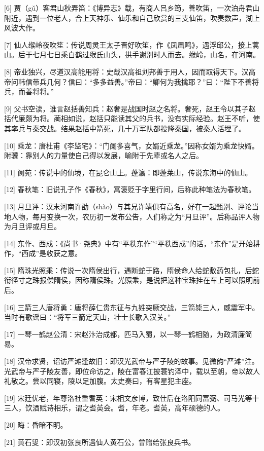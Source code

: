 \documentclass[12pt,UTF8]{ctexbook}
\begin{document}
[6] 贾（gǔ）客君山秋弄笛：《博异志》载，有商人吕乡筠，善吹笛，一次泊舟君山附近，遇到一位老人，合上天神乐、仙乐和自己欣赏的三支仙笛，吹奏数声，湖上风波大作。

[7] 仙人缑岭夜吹笙：传说周灵王太子晋好吹笙，作《凤凰鸣》，遇浮邱公，接上蒿山。后于七月七日乘白鹤过缑氏山头，拱手谢别时人而去。缑岭，山名，在河南。

[8] 帝业独兴，尽道汉高能用将：史载汉高祖刘邦善于用人，因而取得天下。汉高帝问韩信带兵几何？信曰：“多多益善。”帝曰：“卿何为我擒耶？”曰：“陛下不善将兵，而善将将。”

[9] 父书空读，谁言赵括善知兵：赵奢是战国时赵之名将。奢死，赵王令以其子赵括代廉颇为将。蔺相如说，赵括只能读其父的兵书，没有实际经验。赵王不听，使其率兵与秦交战。结果赵括中箭死，几十万军队都投降秦国，被秦人活埋了。

[10] 乘龙：唐杜甫《李监宅》：“门阑多喜气，女婿近乘龙。”因称女婿为乘龙快婿。附骥：靠别人的力量使自己得以发展，喻附于先辈或名人之后。

[11] 阆苑：传说中的仙境，在昆仑山上。蓬瀛：即蓬莱山，传说东海中的仙山。

[12] 春秋笔：旧说孔子作《春秋》，寓褒贬于字里行间，后称此种笔法为春秋笔。

[13] 月旦评：汉末河南许劭（shào）与其兄许靖俱有高名，好在一起甄别、评论当地人物，每月变换一次，农历初一发布公告，人们称之为“月旦评”。后称品评人物为月旦评或月旦。

[14] 东作、西成：《尚书·尧典》中有“平秩东作”“平秩西成”的话，“东作”是开始耕作，“西成”是收获之意。

[15] 隋珠光照乘：传说一次隋侯出行，遇断蛇于路，隋侯命人给蛇敷药包扎，后蛇衔径寸之珠报偿隋侯，因称隋侯珠。光照乘，是说把这种宝珠挂在车上可以照明前后。

[16] 三箭三人唐将勇：唐将薛仁贵东征与九姓突厥交战，三箭毙三人，威震军中。当时有歌谣曰：“将军三箭定天山，壮士长歌入汉关。”

[17] 一琴一鹤赵公清：宋赵汴治成都，匹马入蜀，以一琴一鹤相随，为政清廉简易。

[18] 汉帝求贤，诏访严滩逢故旧：即汉光武帝与严子陵的故事。见微韵“严滩”注。光武帝与严子陵友善，即位命访之，陵在富春江披蓑钓泽中，载以至朝，帝以故人礼敬之。尝以同寝，陵以足加腹。太史奏曰，有客星犯主座。

[19] 宋廷优老，年尊洛社重耆英：宋相文彦博，致仕后在洛阳同富弼、司马光等十三人，饮酒赋诗相乐，谓之耆英会。耆，年老。耆英，高年硕德的人。

[20] 晦：昏暗不明。

[21] 黄石叟：即汉初张良所遇仙人黄石公，曾赠给张良兵书。
\end{document}
